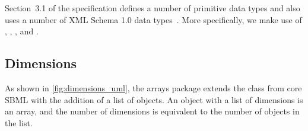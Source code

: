 Section~3.1 of the \sbmlthreecore specification defines a number of primitive data types and also uses a number of XML Schema 1.0 data types~\citep{biron:2000}.   More specifically, we make use of ,  ,  , and .    







\subsection{Dimensions}
\label{sec:dimension}

As shown in \ref{fig:dimensions_uml}, the arrays package extends the \SBase class from core SBML with the addition of a list of \Dimension objects.   An object with a list of dimensions is an array, and the number of dimensions is equivalent to the number of \Dimension objects in the list.   %

